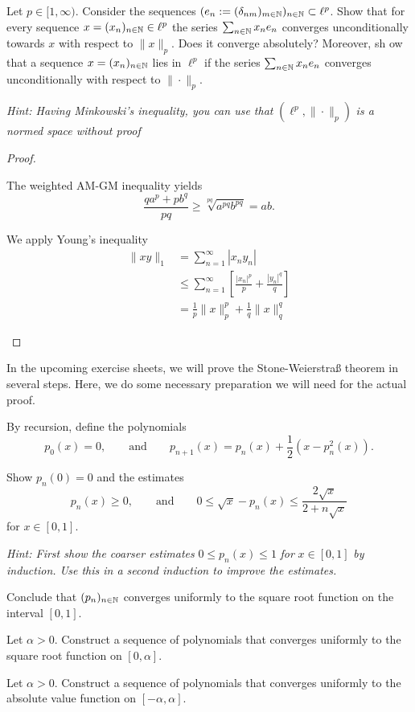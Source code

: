 \begin{Problem}
	Let $p\in [1,\infty)$. Consider the sequences $(e_n:=(\delta_{nm})_{m\in \mathbb{N}})_{n\in \mathbb{N}}\subset \ell^p$. Show that for every sequence $x=(x_n)_{n\in \mathbb{N}}\in \ell^p$ the series $\sum_{n\in \mathbb{N}} x_n e_n$ converges unconditionally towards $x$ with respect to $\|x\|_p$. Does it converge absolutely? Moreover, sh ow that a sequence $x=(x_n)_{n\in \mathbb{N}}$ lies in $\ell^p$ if the series $\sum_{n\in \mathbb{N}}x_n e_n$ converges unconditionally with respect to $\|\cdot\|_p$.

	\emph{Hint: Having Minkowski's inequality, you can use that } $(\ell^p, \|\cdot\|_p)$ \emph{is a normed space without proof}
\end{Problem}
\begin{proof}
	\begin{parts}
	\item The weighted AM-GM inequality yields
		\[
			\frac{q a^p + p b^q}{pq}\ge \sqrt[pq]{a^{pq} b^{pq}} =ab
		.\]
	\item We apply Young's inequality
		\begin{align*}
			\|xy\|_1 &= \sum_{n=1}^\infty |x_n y_n|\\
				 &\le\sum_{n=1}^{\infty} \left[ \frac{|x_n|^p}{p}+\frac{|y_n|^q}{q} \right] \\
				 &=\frac{1}{p}\|x\|_p^p+\frac{1}{q}\|x\|_q^q
		\end{align*}
	\end{parts}
\end{proof}
\begin{Problem}
	In the upcoming exercise sheets, we will prove the Stone-Weierstraß theorem in several steps. Here, we do some necessary preparation we will need for the actual proof.

	By recursion, define the polynomials
	\[
	p_0(x)=0,\qquad\text{and}\qquad p_{n+1}(x)=p_n(x)+\frac{1}{2}(x-p_n^2(x))
	.\] 
	\begin{parts}
	\item Show $p_n(0)=0$ and the estimates
		\[
		p_n(x)\ge 0,\qquad \text{and}\qquad 0\le \sqrt{x} -p_n(x)\le \frac{2\sqrt{x} }{2+n\sqrt{x} }
		\]
		for $x\in [0,1]$.

		\emph{Hint: First show the coarser estimates} $0\le p_n(x)\le 1$ \emph{ for }$x\in [0,1]$ \emph{by induction. Use this in a second induction to improve the estimates.}
	\item Conclude that $(p_n)_{n\in \mathbb{N}}$ converges uniformly to the square root function on the interval $[0,1]$.
	\item Let $\alpha>0$. Construct a sequence of polynomials that converges uniformly to the square root function on $[0,\alpha]$.
	\item Let $\alpha>0$. Construct a sequence of polynomials that converges uniformly to the absolute value function on $[-\alpha, \alpha]$.
	\end{parts}
\end{Problem}
